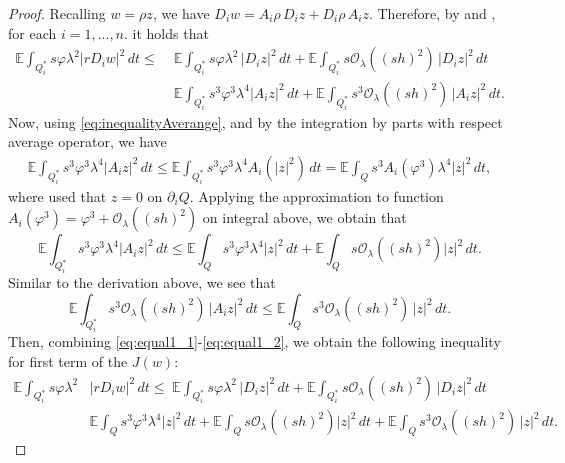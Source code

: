 \documentclass[11pt,oneside,leqno]{amsart}
\numberwithin{equation}{section}
\numberwithin{equation}{section}
\newcommand{\E}{\mathbb{E}}
\begin{document}
\begin{proof}
Recalling $w=\rho z$, we have $D_{i}w=A_i\rho\,D_iz+D_i\rho\,A_iz$. Therefore, by \cite[Lemma 3.7]{BHLR:2010b} and {\cite[Proposition 3.3]{AA:perez:2024}}, for each $i{ =1,...,n.}$ it holds that
\begin{equation}\label{eq:equal1_1}
    \begin{split}
        \E\int_{Q_{i}^{\ast}}s\varphi \lambda^2|rD_i w|^2\,dt\leq\;& \E\int_{Q_i^{\ast}}s\varphi\lambda^2\,|D_iz|^2\,dt+\E\int_{Q_{i}^{\ast}}s\mathcal{O}_{\lambda}((sh)^2)\,|D_iz|^2\,dt\\
        &\E\int_{Q_i^{\ast}}s^3\varphi^3\lambda^4|A_iz|^2\,dt+\E\int_{Q_i^{\ast}}s^3\mathcal{O}_{\lambda}((sh)^2)\,|A_iz|^2\,dt.
    \end{split}
\end{equation}
Now, using \eqref{eq:inequalityAverange}, and by the integration by parts with respect average operator, we have
\begin{equation*}
    \begin{split}
\E\int_{Q_i^{\ast}}s^3\varphi^3\lambda^4|A_iz|^2\,dt\leq  \E\int_{Q_i^{\ast}}s^3\varphi^3\lambda^4A_i(|z|^2)\,dt=\E\int_{Q}s^3A_i(\varphi^3)\lambda^4|z|^2\,dt,
    \end{split}
\end{equation*}
where used that $z=0$ on $\partial_i Q$. Applying the approximation to function $A_i(\varphi^3)=\varphi^3+\mathcal{O}_{\lambda}((sh)^2)$ on integral above, we obtain that
\begin{equation}\label{eq:equall1_2*}
\E\int_{Q_i^{\ast}}s^3\varphi^3\lambda^4|A_iz|^2\,dt\leq\E\int_{Q}s^3\varphi^3\lambda^4|z|^2\,dt+\E\int_{Q}s\mathcal{O}_{\lambda}((sh)^2)|z|^2\,dt.
\end{equation}
Similar to the derivation above, we see that
\begin{equation}\label{eq:equal1_2}
    \E\int_{Q_i^{\ast}}s^3\mathcal{O}_{\lambda}((sh)^2)\,|A_iz|^2\,dt\leq \E\int_{Q}s^3\mathcal{O}_{\lambda}((sh)^2)\,|z|^2\,dt.
\end{equation}
Then, combining \eqref{eq:equal1_1}-\eqref{eq:equal1_2}, we obtain the following inequality for first term of the $J(w)$:
\begin{equation}\label{chagelleofDi}
\begin{split}
   \E\int_{Q_{i}^{\ast}}s\varphi \lambda^2&|rD_i w|^2\,dt\leq\; \E\int_{Q_i^{\ast}}s\varphi\lambda^2\,|D_iz|^2\,dt+\E\int_{Q_{i}^{\ast}}s\mathcal{O}_{\lambda}((sh)^2)\,|D_iz|^2\,dt\\
   &\E\int_{Q}s^3\varphi^3\lambda^4|z|^2\,dt+\E\int_{Q}s\mathcal{O}_{\lambda}((sh)^2)|z|^2\,dt+\E\int_{Q}s^3\mathcal{O}_{\lambda}((sh)^2)\,|z|^2\,dt.

\end{split}
\end{equation}
\end{proof}
\end{document}
